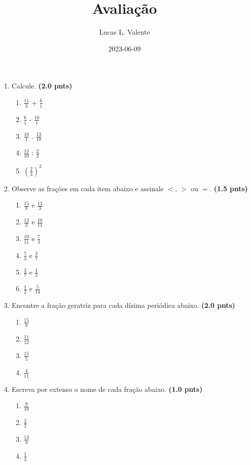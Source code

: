 \documentclass{article}
\title{Avaliação}
\author{Lucas L. Valente}
\date{2023-06-09}
\begin{document}
\maketitle
\newpage

\begin{enumerate}
	\item Calcule. \textbf{(2.0 pnts)}

		\begin{enumerate}
			\item $\frac{11}{3}$ + $\frac{6}{1}$
			\item $\frac{6}{1}$ - $\frac{10}{1}$
			\item $\frac{10}{1}$ . $\frac{13}{10}$
			\item $\frac{13}{10}$ : $\frac{2}{3}$
			\item $\left(\frac{2}{3}\right) ^ 2$
		\end{enumerate}

	\item Observe as frações em cada item abaixo e assinale $<$, $>$ ou $=$. \textbf{(1.5 pnts)}

		\begin{enumerate}
			\item $\frac{15}{8}$ e $\frac{13}{3}$
			\item $\frac{13}{3}$ e $\frac{10}{11}$
			\item $\frac{10}{11}$ e $\frac{7}{3}$
			\item $\frac{7}{3}$ e $\frac{3}{7}$
			\item $\frac{3}{7}$ e $\frac{1}{2}$
			\item $\frac{1}{2}$ e $\frac{5}{14}$
		\end{enumerate}

	\item Encontre a fração geratriz para cada dízima periódica abaixo. \textbf{(2.0 pnts)}

		\begin{enumerate}
			\item $\frac{15}{9}$
			\item $\frac{11}{12}$
			\item $\frac{15}{5}$
			\item $\frac{4}{11}$
		\end{enumerate}

	\item Escreva por extenso o nome de cada fração abaixo. \textbf{(1.0 pnts)}

		\begin{enumerate}
			\item $\frac{9}{10}$
			\item $\frac{2}{2}$
			\item $\frac{13}{9}$
			\item $\frac{1}{3}$
		\end{enumerate}


\end{enumerate}
\end{document}
